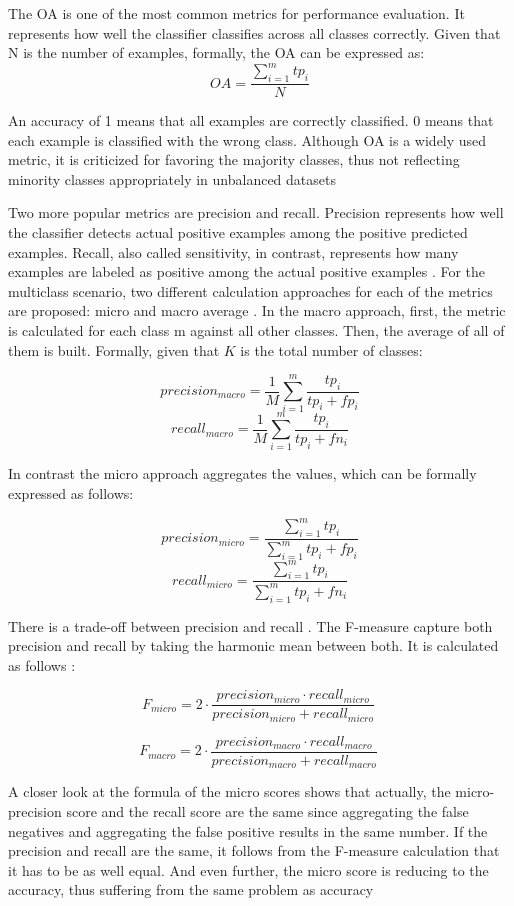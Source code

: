 \documentclass[12pt, a4paper, titlepage]{article}
\begin{document}
The \ac{OA} is one of the most common metrics for performance evaluation. It represents how well the classifier classifies across all classes correctly. Given that N is the number of examples, formally, the \ac{OA} can be expressed as: 
\[OA = \frac{\sum_{i=1}^m tp_i}{N} \]

An accuracy of 1 means that all examples are correctly classified. 0 means that each example is classified with the wrong class. \citep{Berthold2020}
Although \ac{OA} is a widely used metric, it is criticized for favoring the majority classes, thus not reflecting minority classes appropriately in unbalanced datasets \citep{Berthold2020, Fatourechi2008}

Two more popular metrics are precision and recall. Precision represents how well the classifier detects actual positive examples among the positive predicted examples. Recall, also called sensitivity, in contrast, represents how many examples are labeled as positive among the actual positive examples \citep{Berthold2020}. For the multiclass scenario, two different calculation approaches for each of the metrics are proposed: micro and macro average \citep{Branco2017}. In the macro approach, first, the metric is calculated for each class m against all other classes. Then, the average of all of them is built. Formally, given that $K$ is the total number of classes: 

\[precision_{macro} = \frac{1}{M} \sum_{i=1}^m \frac{tp_{i}}{tp_{i} + fp_{i}}\]
\[recall_{macro} = \frac{1}{M} \sum_{i=1}^m \frac{tp_{i}}{tp_{i} + fn_{i}}\]

In contrast the micro approach aggregates the values, which can be formally expressed as follows: 

\[precision_{micro} = \frac{\sum_{i=1}^m tp_i}{\sum_{i=1}^m tp_i + fp_i}\]
\[recall_{micro} = \frac{\sum_{i=1}^m tp_i}{\sum_{i=1}^m tp_i + fn_i}\]

There is a trade-off between precision and recall \citep{Buckland1994}. The F-measure capture both precision and recall by taking the harmonic mean between both. It is calculated as follows \citep{Branco2017,Pan2016}:  

\[F_{micro} = 2 \cdot \frac{precision_{micro} \cdot recall_{micro} }{precision_{micro} + recall_{micro} }\ \]

\[F_{macro} = 2 \cdot \frac{precision_{macro} \cdot recall_{macro} }{precision_{macro} + recall_{macro} }\ \]

A closer look at the formula of the micro scores shows that actually, the micro-precision score and the recall score are the same since aggregating the false negatives and aggregating the false positive results in the same number. If the precision and recall are the same, it follows from the F-measure calculation that it has to be as well equal. And even further, the micro score is reducing to the accuracy, thus suffering from the same problem as accuracy \citep{grandini2020}
\end{document}
